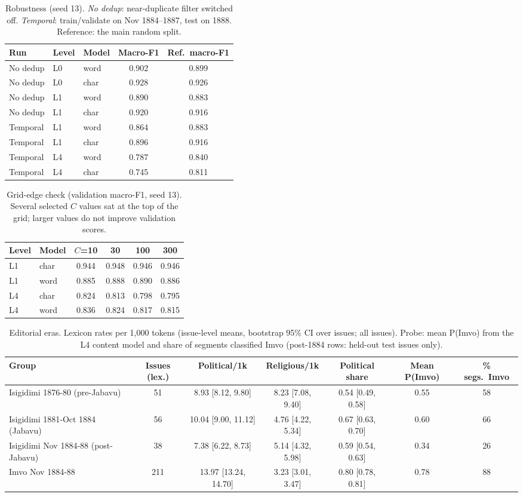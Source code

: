 \begin{table}[h]\centering\small\caption{Robustness (seed 13). \emph{No dedup}: near-duplicate filter switched off. \emph{Temporal}: train/validate on Nov 1884--1887, test on 1888. Reference: the main random split.}
\begin{tabular}{@{}lllcc@{}}\toprule Run & Level & Model & Macro-F1 & Ref.\ macro-F1 \\ \midrule
No dedup & L0 & word & 0.902 & 0.899 \\
No dedup & L0 & char & 0.928 & 0.926 \\
No dedup & L1 & word & 0.890 & 0.883 \\
No dedup & L1 & char & 0.920 & 0.916 \\
Temporal & L1 & word & 0.864 & 0.883 \\
Temporal & L1 & char & 0.896 & 0.916 \\
Temporal & L4 & word & 0.787 & 0.840 \\
Temporal & L4 & char & 0.745 & 0.811 \\
\bottomrule\end{tabular}\label{tab:s2}\end{table}
\begin{table}[h]\centering\small\caption{Grid-edge check (validation macro-F1, seed 13). Several selected $C$ values sat at the top of the grid; larger values do not improve validation scores.}
\begin{tabular}{@{}llcccc@{}}\toprule Level & Model & $C$=10 & 30 & 100 & 300 \\ \midrule
L1 & char & 0.944 & 0.948 & 0.946 & 0.946 \\
L1 & word & 0.885 & 0.888 & 0.890 & 0.886 \\
L4 & char & 0.824 & 0.813 & 0.798 & 0.795 \\
L4 & word & 0.836 & 0.824 & 0.817 & 0.815 \\
\bottomrule\end{tabular}\label{tab:s3}\end{table}
\begin{table}[h]\centering\small\caption{Editorial eras. Lexicon rates per 1{,}000 tokens (issue-level means, bootstrap 95\% CI over issues; all issues). Probe: mean P(Imvo) from the L4 content model and share of segments classified Imvo (post-1884 rows: held-out test issues only).}
\begin{tabular}{@{}lcccccc@{}}\toprule Group & Issues (lex.) & Political/1k & Religious/1k & Political share & Mean P(Imvo) & \% segs.\ Imvo \\ \midrule
Isigidimi 1876-80 (pre-Jabavu) & 51 & 8.93 [8.12, 9.80] & 8.23 [7.08, 9.40] & 0.54 [0.49, 0.58] & 0.55 & 58 \\
Isigidimi 1881-Oct 1884 (Jabavu) & 56 & 10.04 [9.00, 11.12] & 4.76 [4.22, 5.34] & 0.67 [0.63, 0.70] & 0.60 & 66 \\
Isigidimi Nov 1884-88 (post-Jabavu) & 38 & 7.38 [6.22, 8.73] & 5.14 [4.32, 5.98] & 0.59 [0.54, 0.63] & 0.34 & 26 \\
Imvo Nov 1884-88 & 211 & 13.97 [13.24, 14.70] & 3.23 [3.01, 3.47] & 0.80 [0.78, 0.81] & 0.78 & 88 \\
\bottomrule\end{tabular}\label{tab:s4}\end{table}
